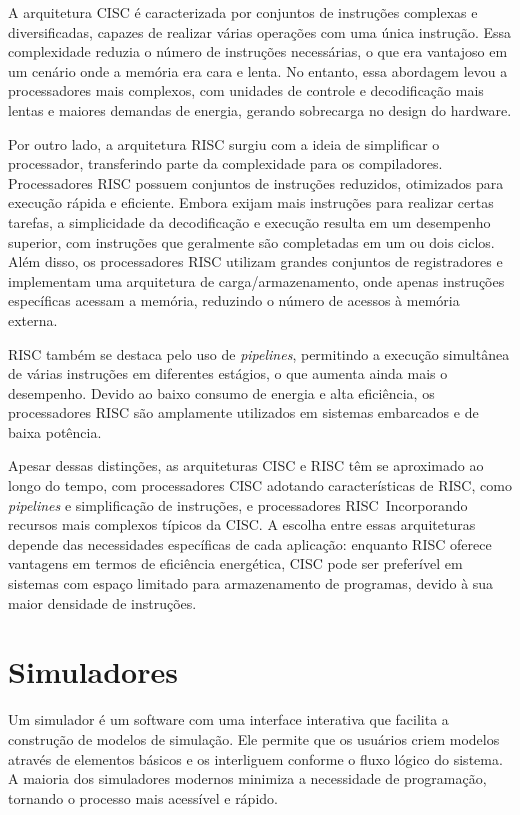 \documentclass[
	12pt,				%
	openright,			%
	oneside,			%
	a4paper,			%
	english,			%
	french,				%
	spanish,			%
	brazil,				%
	]{abntex2}
\begin{document}
A arquitetura CISC é caracterizada por conjuntos de instruções complexas e diversificadas, capazes de realizar várias operações com uma única instrução. Essa complexidade reduzia o número de instruções necessárias, o que era vantajoso em um cenário onde a memória era cara e lenta. No entanto, essa abordagem levou a processadores mais complexos, com unidades de controle e decodificação mais lentas e maiores demandas de energia, gerando sobrecarga no design do hardware.

Por outro lado, a arquitetura RISC surgiu com a ideia de simplificar o processador, transferindo parte da complexidade para os compiladores. Processadores RISC possuem conjuntos de instruções reduzidos, otimizados para execução rápida e eficiente. Embora exijam mais instruções para realizar certas tarefas, a simplicidade da decodificação e execução resulta em um desempenho superior, com instruções que geralmente são completadas em um ou dois ciclos. Além disso, os processadores RISC utilizam grandes conjuntos de registradores e implementam uma arquitetura de carga/armazenamento, onde apenas instruções específicas acessam a memória, reduzindo o número de acessos à memória externa.

RISC também se destaca pelo uso de \textit{pipelines}, permitindo a execução simultânea de várias instruções em diferentes estágios, o que aumenta ainda mais o desempenho. Devido ao baixo consumo de energia e alta eficiência, os processadores RISC são amplamente utilizados em sistemas embarcados e de baixa potência.

Apesar dessas distinções, as arquiteturas CISC e RISC têm se aproximado ao longo do tempo, com processadores CISC adotando características de RISC, como \textit{pipelines} e simplificação de instruções, e processadores RISC~Incorporando recursos mais complexos típicos da CISC. A escolha entre essas arquiteturas depende das necessidades específicas de cada aplicação: enquanto RISC oferece vantagens em termos de eficiência energética, CISC pode ser preferível em sistemas com espaço limitado para armazenamento de programas, devido à sua maior densidade de instruções.\cite[p.19-21]{catsoulis_designing_2002}

\section{Simuladores}
Um simulador é um software com uma interface interativa que facilita a construção de modelos de simulação. Ele permite que os usuários criem modelos através de elementos básicos e os interliguem conforme o fluxo lógico do sistema. A maioria dos simuladores modernos minimiza a necessidade de programação, tornando o processo mais acessível e rápido.\cite{chwif_modelagem_2014}
\end{document}
